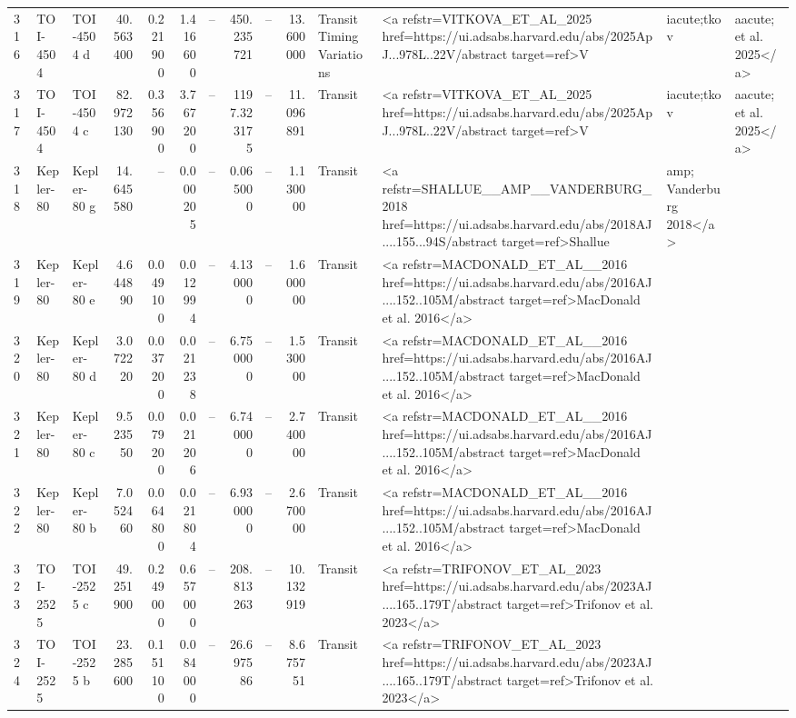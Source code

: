 \begin{tabular}{lllrrrrrrrll}
316 & TOI-4504 & TOI-4504 d & 40.563400 & 0.221900 & 1.416600 & -- & 450.235721 & -- & 13.600000 & Transit Timing Variations & <a refstr=VITKOVA_ET_AL_2025 href=https://ui.adsabs.harvard.edu/abs/2025ApJ...978L..22V/abstract target=ref>V&iacute;tkov&aacute; et al. 2025</a> \\
317 & TOI-4504 & TOI-4504 c & 82.972130 & 0.356900 & 3.767200 & -- & 1197.323175 & -- & 11.096891 & Transit & <a refstr=VITKOVA_ET_AL_2025 href=https://ui.adsabs.harvard.edu/abs/2025ApJ...978L..22V/abstract target=ref>V&iacute;tkov&aacute; et al. 2025</a> \\
318 & Kepler-80 & Kepler-80 g & 14.645580 & -- & 0.000205 & -- & 0.065000 & -- & 1.130000 & Transit & <a refstr=SHALLUE__AMP__VANDERBURG_2018 href=https://ui.adsabs.harvard.edu/abs/2018AJ....155...94S/abstract target=ref>Shallue &amp; Vanderburg 2018</a> \\
319 & Kepler-80 & Kepler-80 e & 4.644890 & 0.049100 & 0.012994 & -- & 4.130000 & -- & 1.600000 & Transit & <a refstr=MACDONALD_ET_AL__2016 href=https://ui.adsabs.harvard.edu/abs/2016AJ....152..105M/abstract target=ref>MacDonald et al. 2016</a> \\
320 & Kepler-80 & Kepler-80 d & 3.072220 & 0.037200 & 0.021238 & -- & 6.750000 & -- & 1.530000 & Transit & <a refstr=MACDONALD_ET_AL__2016 href=https://ui.adsabs.harvard.edu/abs/2016AJ....152..105M/abstract target=ref>MacDonald et al. 2016</a> \\
321 & Kepler-80 & Kepler-80 c & 9.523550 & 0.079200 & 0.021206 & -- & 6.740000 & -- & 2.740000 & Transit & <a refstr=MACDONALD_ET_AL__2016 href=https://ui.adsabs.harvard.edu/abs/2016AJ....152..105M/abstract target=ref>MacDonald et al. 2016</a> \\
322 & Kepler-80 & Kepler-80 b & 7.052460 & 0.064800 & 0.021804 & -- & 6.930000 & -- & 2.670000 & Transit & <a refstr=MACDONALD_ET_AL__2016 href=https://ui.adsabs.harvard.edu/abs/2016AJ....152..105M/abstract target=ref>MacDonald et al. 2016</a> \\
323 & TOI-2525 & TOI-2525 c & 49.251900 & 0.249000 & 0.657000 & -- & 208.813263 & -- & 10.132919 & Transit & <a refstr=TRIFONOV_ET_AL_2023 href=https://ui.adsabs.harvard.edu/abs/2023AJ....165..179T/abstract target=ref>Trifonov et al. 2023</a> \\
324 & TOI-2525 & TOI-2525 b & 23.285600 & 0.151100 & 0.084000 & -- & 26.697586 & -- & 8.675751 & Transit & <a refstr=TRIFONOV_ET_AL_2023 href=https://ui.adsabs.harvard.edu/abs/2023AJ....165..179T/abstract target=ref>Trifonov et al. 2023</a> \\

\end{tabular}
